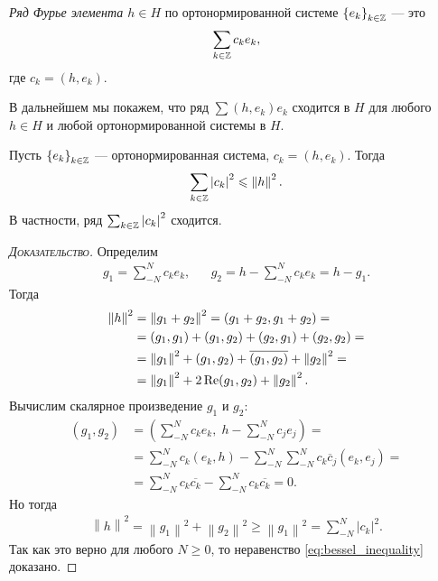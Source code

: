 \documentclass[../complex-analysis.tex]{subfiles}
\begin{document}
\begin{df}
 \textit{Ряд Фурье элемента $ h \in H $} по ортонормированной системе $ \left\{e_k\right\}_{k \in \mathbb{Z}}  $ --- это
 \begin{align*}
  \sum_{k\in\mathbb{Z}} c_ke_k, 
 \end{align*} где $c_k = (h,e_k)$.
\end{df}
\begin{remrk*}
 В дальнейшем мы покажем, что ряд $ \sum (h, e_k)e_k $ сходится в $ H $ для любого $ h \in H $ и любой ортонормированной системы в $ H $.
\end{remrk*}

\begin{claim}
 Пусть $ \left\{e_k\right\}_{k \in \mathbb{Z}}  $ --- ортонормированная система, $ c_k = (h,e_k) $. Тогда 
 \begin{align}
  \label{eq:bessel_inequality}
  \sum_{k \in\mathbb{Z}} \left| c_k \right|^{2} \leqslant \left\| h \right\|^{2}.
 \end{align} В частности, ряд $ \sum_{k \in \mathbb{Z}} \left| c_k \right|^{2} $ сходится.
\end{claim}
\begin{proof}[\normalfont\textsc{Доказательство}]
 Определим
 \begin{align*}
  g_1 = \sum_{-N}^{N}c_ke_k, && g_2 = h - \sum_{-N}^{N}c_ke_k = h - g_1.
 \end{align*} Тогда
 \begin{align*}
  \left\| h \right\|^{2} &= \left\| g_1 + g_2 \right\|^{2} = (g_1+g_2,g_1+g_2) = \\
  &= (g_1,g_1) + (g_1,g_2) + (g_2,g_1) + (g_2,g_2) = \\
  &= \left\| g_1 \right\|^{2} + (g_1, g_2) + \overline{(g_1,g_2)} + \left\| g_2 \right\|^{2} = \\
  &= \left\| g_1 \right\|^{2} + 2 \operatorname{Re} (g_1,g_2) + \left\| g_2 \right\|^{2}.
 \end{align*}
 Вычислим скалярное произведение $ g_1 $ и $ g_2 $:
 \begin{align*}
  (g_1,g_2) &= \left( \sum_{-N}^{N}c_ke_k,\; h - \sum_{-N}^{N} c_je_j \right) = \\
  &=  \sum_{-N}^{N}c_k(e_k,h)  - \sum_{-N}^{N} \sum_{-N}^{N} c_k \overline c_j (e_k, e_j) = \\
  &= \sum_{-N}^{N} c_k \overline{c_k} - \sum_{-N}^{N}c_k \overline{c_k} = 0.
 \end{align*} Но тогда
 \begin{align*}
  \left\| h \right\|^{2} = \left\| g_1 \right\|^{2} + \left\| g_2 \right\|^{2} \geqslant \left\| g_1 \right\|^{2} = \sum_{-N}^{N}\left| c_k \right|^{2}.
 \end{align*} Так как это верно для любого $ N \geqslant 0 $, то неравенство \eqref{eq:bessel_inequality} доказано.
\end{proof}
\end{document}
